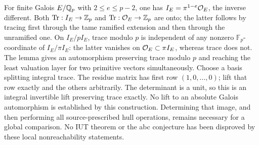 For finite Galois $E/\mathbb Q_p$ with $2\le e\le p-2$, one has
$I_E=\pi^{1-e}\mathcal O_E$, the inverse different. Both
$\operatorname{Tr}:I_E\to\mathbb Z_p$ and
$\operatorname{Tr}:\mathcal O_E\to\mathbb Z_p$ are onto; the latter follows by
tracing first through the tame ramified extension and then through the
unramified one. On $I_E/pI_E$, trace modulo $p$ is independent of any
nonzero $\mathbb F_p$-coordinate of $I_E/\pi I_E$: the latter vanishes
on $\mathcal O_E\subset\pi I_E$, whereas trace does not. The lemma gives an
automorphism preserving trace modulo $p$ and reaching the least
valuation layer for two primitive vectors simultaneously.
Choose a basis splitting integral trace. The residue matrix has first
row $(1,0,\ldots,0)$; lift that row exactly and the others arbitrarily.
The determinant is a unit, so this is an integral invertible lift
preserving trace exactly. No lift to an absolute Galois automorphism
is established by this construction. Determining that image, and then performing all
source-prescribed hull operations, remains necessary for a global
comparison. No IUT theorem or the abc conjecture has been disproved
by these local nonreachability statements.
